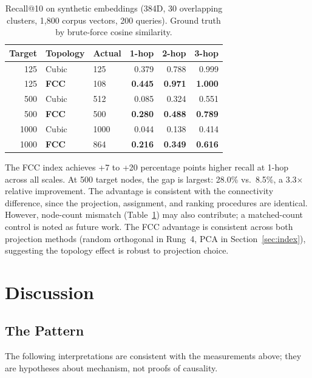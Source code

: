 \documentclass[11pt]{article}
\begin{document}
\begin{table}[H]
\centering
\caption{Recall@10 on synthetic embeddings (384D, 30 overlapping
clusters, 1{,}800 corpus vectors, 200 queries). Ground truth by
brute-force cosine similarity.}
\label{tab:index}
\begin{tabular}{rllrrr}
\toprule
Target & Topology & Actual & 1-hop & 2-hop & 3-hop \\
\midrule
125  & Cubic       & 125 & 0.379 & 0.788 & 0.999 \\
125  & \textbf{FCC}& 108 & \textbf{0.445} & \textbf{0.971} & \textbf{1.000} \\
\midrule
500  & Cubic       & 512 & 0.085 & 0.324 & 0.551 \\
500  & \textbf{FCC}& 500 & \textbf{0.280} & \textbf{0.488} & \textbf{0.789} \\
\midrule
1000 & Cubic       & 1000 & 0.044 & 0.138 & 0.414 \\
1000 & \textbf{FCC}& 864 & \textbf{0.216} & \textbf{0.349} & \textbf{0.616} \\
\bottomrule
\end{tabular}
\end{table}

The FCC index achieves +7 to +20 percentage points higher recall
at 1-hop across all scales. At 500 target nodes, the gap is
largest: 28.0\% vs.\ 8.5\%, a 3.3$\times$ relative improvement.
The advantage is consistent with the connectivity difference, since the
projection, assignment, and ranking procedures are identical. However,
node-count mismatch (Table~\ref{tab:index}) may also contribute; a
matched-count control is noted as future work. The FCC advantage is
consistent across both projection methods (random orthogonal in
Rung~4, PCA in Section~\ref{sec:index}), suggesting the topology
effect is robust to projection choice.

\section{Discussion}
\label{sec:discussion}

\subsection{The Pattern}

The following interpretations are consistent with the measurements
above; they are hypotheses about mechanism, not proofs of causality.
\end{document}
